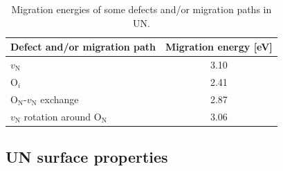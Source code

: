 \documentclass[preprint,12pt,sort&compress]{elsarticle}
\newcommand{\?}{\stackrel{?}{=}}
\begin{document}
\begin{table}[h!]
\centering
\caption{Migration energies of some defects and/or migration paths in UN.}
\footnotesize
\begin{tabular}{lc}
\hline 
Defect and/or migration path & Migration energy [eV] \\
\hline
$v_\text{N}$ & 3.10 \\
O$_i$          & 2.41 \\
O$_\text{N}$-$v_\text{N}$ exchange & 2.87 \\
$v_\text{N}$ rotation around O$_\text{N}$ & 3.06 \\
\hline
\end{tabular}
\label{Tab:Mig}
\end{table}

\subsection{UN surface properties}



\end{document}
